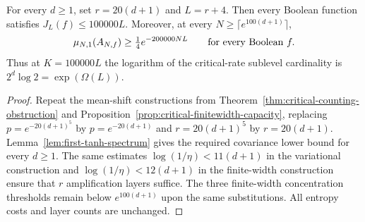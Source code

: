 \begin{corollary}
\label{cor:critical-linear-depth-obstruction}
For every $d\ge1$, set $r=20(d+1)$ and $L=r+4$.
Then every Boolean function satisfies $J_L(f)\le100000L$.
Moreover, at every $N\ge\lceil e^{100(d+1)}\rceil$,
\[
 \mu_{N,1}(A_{N,f})\ge\tfrac14e^{-200000NL}
 \qquad\hbox{for every Boolean }f.
\]
Thus at $K=100000L$ the logarithm of the critical-rate sublevel
cardinality is $2^d\log2=\exp(\Omega(L))$.
\end{corollary}

\begin{proof}
Repeat the mean-shift constructions from
Theorem~\ref{thm:critical-counting-obstruction} and
Proposition~\ref{prop:critical-finitewidth-capacity}, replacing
$p=e^{-20(d+1)^5}$ by $p=e^{-20(d+1)}$ and
$r=20(d+1)^5$ by $r=20(d+1)$.
Lemma~\ref{lem:first-tanh-spectrum} gives the required covariance lower
bound for every $d\ge1$. The same estimates
$\log(1/\eta)<11(d+1)$ in the variational construction and
$\log(1/\eta)<12(d+1)$ in the finite-width construction ensure that
$r$ amplification layers suffice. The three finite-width concentration
thresholds remain below $e^{100(d+1)}$ upon the same substitutions.
All entropy costs and layer counts are unchanged.
\end{proof}
